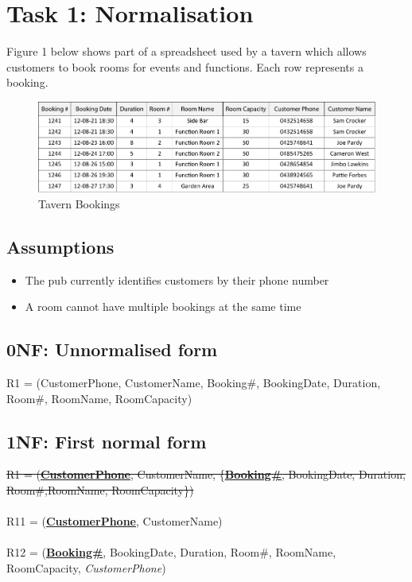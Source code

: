 \section{Task 1: Normalisation}

Figure 1 below shows part of a spreadsheet used by a tavern which allows customers to book rooms for events and functions. Each row represents a booking.

\begin{figure}[H]
\centering
\caption{Tavern Bookings}
\includegraphics[scale=1]{./img/task1.pdf}
\end{figure}

\subsection*{Assumptions}

\begin{itemize}
\item The pub currently identifies customers by their phone number
\item A room cannot have multiple bookings at the same time
\end{itemize}

\subsection{0NF: Unnormalised form}

R1 = (CustomerPhone, CustomerName, {Booking\#, BookingDate, Duration, Room\#, RoomName, RoomCapacity})

\subsection{1NF: First normal form}

\sout{R1 = (\textbf{\underline{CustomerPhone}}, CustomerName, \{\textbf{\underline{Booking\#}}, BookingDate, Duration, Room\#,RoomName, RoomCapacity\})}
\\\\
R11 = (\textbf{\underline{CustomerPhone}}, CustomerName)
\\\\
R12 = (\textbf{\underline{Booking\#}}, BookingDate, Duration, Room\#, RoomName, RoomCapacity, \emph{CustomerPhone})


